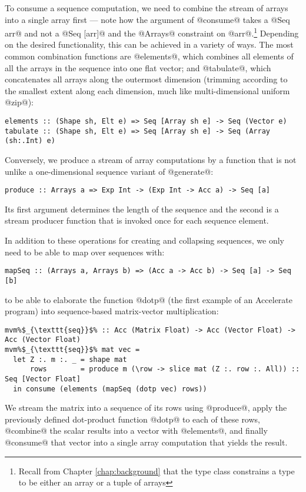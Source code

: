 To consume a sequence computation, we need to combine the stream of arrays into a single array first --- note how the argument of @consume@ takes a @Seq arr@ and not a @Seq [arr]@ and the @Arrays@ constraint on @arr@.\footnote{Recall from Chapter \ref{chap:background} that the type class  constrains a type to be either an array or a tuple of arrays} Depending on the desired functionality, this can be achieved in a variety of ways. The most common combination functions are @elements@, which combines all elements of all the arrays in the sequence into one flat vector; and @tabulate@, which concatenates all arrays along the outermost dimension (trimming according to the smallest extent along each dimension, much like multi-dimensional uniform @zip@):
%
\begin{lstlisting}
elements :: (Shape sh, Elt e) => Seq [Array sh e] -> Seq (Vector e)
tabulate :: (Shape sh, Elt e) => Seq [Array sh e] -> Seq (Array (sh:.Int) e)
\end{lstlisting}

Conversely, we produce a stream of array computations by a function that is not unlike a one-dimensional sequence variant of @generate@:
%
\begin{lstlisting}
produce :: Arrays a => Exp Int -> (Exp Int -> Acc a) -> Seq [a]
\end{lstlisting}
%
Its first argument determines the length of the sequence and the second is a stream producer function that is invoked once for each sequence element.

In addition to these operations for creating and collapsing sequences, we only need to be able to map over sequences with:
%
\begin{lstlisting}
mapSeq :: (Arrays a, Arrays b) => (Acc a -> Acc b) -> Seq [a] -> Seq [b]
\end{lstlisting}
%
to be able to elaborate the function @dotp@ (the first example of an Accelerate program) into sequence-based matrix-vector multiplication:
%
\begin{lstlisting}
mvm%$_{\texttt{seq}}$% :: Acc (Matrix Float) -> Acc (Vector Float) -> Acc (Vector Float)
mvm%$_{\texttt{seq}}$% mat vec =
  let Z :. m :. _ = shape mat
      rows        = produce m (\row -> slice mat (Z :. row :. All)) :: Seq [Vector Float]
  in consume (elements (mapSeq (dotp vec) rows))
\end{lstlisting}
%
We stream the matrix into a sequence of its rows using @produce@, apply the previously defined dot-product function @dotp@ to each of these rows, @combine@ the scalar results into a vector with @elements@, and finally @consume@ that vector into a single array computation that yields the result.

